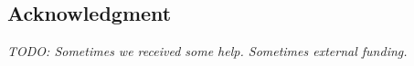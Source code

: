 \documentclass[a4paper, conference]{IEEEtran}
\newcommand{\todo}[1]{{\emph{TODO: #1}}}
\begin{document}
\subsection*{Acknowledgment}

\todo{Sometimes we received some help. Sometimes external funding.}




%


\end{document}
